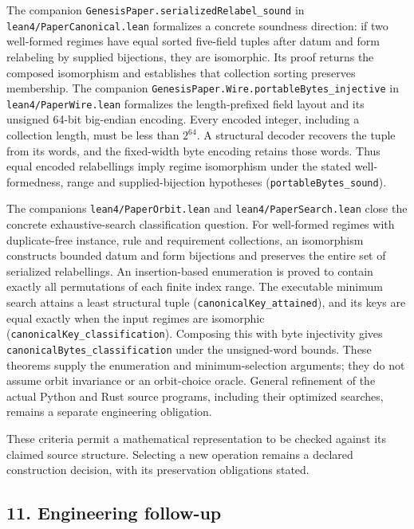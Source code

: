 \documentclass[
  11pt,
]{article}
\begin{document}
The companion \nolinkurl{GenesisPaper.serializedRelabel_sound} in
\nolinkurl{lean4/PaperCanonical.lean} formalizes a concrete soundness
direction: if two well-formed regimes have equal sorted five-field
tuples after datum and form relabeling by supplied bijections, they are
isomorphic. Its proof returns the composed isomorphism and establishes
that collection sorting preserves membership. The companion
\nolinkurl{GenesisPaper.Wire.portableBytes_injective} in
\nolinkurl{lean4/PaperWire.lean} formalizes the length-prefixed field
layout and its unsigned 64-bit big-endian encoding. Every encoded
integer, including a collection length, must be less than \(2^{64}\). A
structural decoder recovers the tuple from its words, and the
fixed-width byte encoding retains those words. Thus equal encoded
relabellings imply regime isomorphism under the stated well-formedness,
range and supplied-bijection hypotheses (\nolinkurl{portableBytes_sound}).

The companions \nolinkurl{lean4/PaperOrbit.lean} and
\nolinkurl{lean4/PaperSearch.lean} close the concrete exhaustive-search
classification question. For well-formed regimes with duplicate-free
instance, rule and requirement collections, an isomorphism constructs
bounded datum and form bijections and preserves the entire set of
serialized relabellings. An insertion-based enumeration is proved to
contain exactly all permutations of each finite index range. The
executable minimum search attains a least structural tuple
(\nolinkurl{canonicalKey_attained}), and its keys are equal exactly when
the input regimes are isomorphic
(\nolinkurl{canonicalKey_classification}). Composing this with byte
injectivity gives \nolinkurl{canonicalBytes_classification} under the
unsigned-word bounds. These theorems supply the enumeration and
minimum-selection arguments; they do not assume orbit invariance or an
orbit-choice oracle. General refinement of the actual Python and Rust
source programs, including their optimized searches, remains a separate
engineering obligation.

These criteria permit a mathematical representation to be checked
against its claimed source structure. Selecting a new operation remains
a declared construction decision, with its preservation obligations
stated.

\subsection{11. Engineering follow-up}\label{engineering-follow-up}
\end{document}
